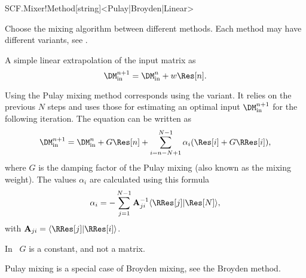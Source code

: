 \begin{fdfentry}{SCF.Mixer!Method}[string]<Pulay|Broyden|Linear>

  Choose the mixing algorithm between different methods. Each method
  may have different variants, see .
  
  \begin{fdfoptions}

    \option[Linear] %
    A simple linear extrapolation of the input matrix as
    \begin{equation}
      \DM^{n+1}_{\mathrm{in}} = \DM^n_{\mathrm{in}} + w \Res[n].
    \end{equation}


    \option[Pulay] %
    Using the Pulay mixing method corresponds using the
    \citet{Kresse1996} variant. It relies on the previous $N$ steps and
    uses those for estimating an optimal input
    $\DM^{n+1}_{\mathrm{in}}$ for the following iteration. The
    equation can be written as
    \begin{equation}
      \DM^{n+1}_{\mathrm{in}} = \DM^n_{\mathrm{in}} + G \Res[n]
      + \sum_{i=n-N+1}^{N-1} \alpha_i (\Res[i] + G \RRes[i]),
    \end{equation}
    where $G$ is the damping factor of the Pulay mixing (also known as
    the mixing weight).
    The values $\alpha_i$ are calculated using this formula
    \begin{equation}
      \alpha_i = - \sum_{j=1}^{N-1}\mathbf A_{ji}^{-1} 
         \langle \RRes[j] | \Res[N] \rangle,
    \end{equation}    
    with $\mathbf A_{ji} = \langle \RRes[j] | \RRes[i] \rangle$.

    In \siesta\ $G$ is a constant, and not a matrix.

    \note Pulay mixing is a special case of Broyden mixing, see the
    Broyden method.



\end{fdfoptions}
\end{fdfentry}
